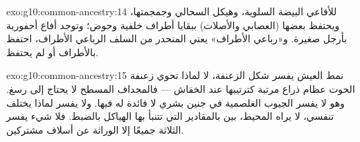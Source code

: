 \begin{solution}{exo:g10:common-ancestry:14}
للأفاعي البيضة السلوية، وهيكل السحالي وجمجمتها، ويحتفظ بعضها (العصابي
والأصلات) ببقايا أطراف خلفية وحوض؛ وتوجد أفاع أحفورية بأرجل صغيرة.
و«رباعي الأطراف» يعني المنحدر من السلف الرباعي الأطراف، احتفظ
بالأطراف أو لم يحتفظ.
\end{solution}

\begin{solution}{exo:g10:common-ancestry:15}
نمط العيش يفسر شكل الزعنفة، لا لماذا تحوي زعنفة الحوت عظام ذراع مرتبة
كترتيبها عند الخفاش --- فالمجداف المسطح لا يحتاج إلى رسغ. وهو لا يفسر
الجيوب الغلصمية في جنين بشري لا فائدة له فيها. ولا يفسر لماذا يختلف
 تنفسي، لا يراه المحيط، بين  بالمقادير التي تتنبأ بها
الهياكل بالضبط. فلا شيء يفسر الثلاثة جميعًا إلا الوراثة عن أسلاف
مشتركين.
\end{solution}

